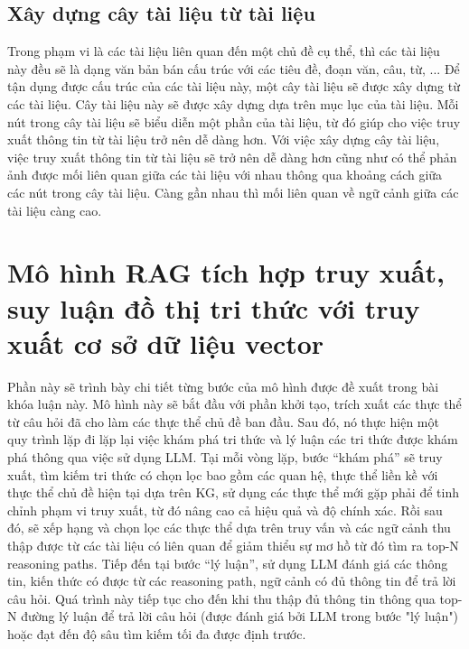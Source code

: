 \subsection{Xây dựng cây tài liệu từ tài liệu}
\label{subsection:document_tree_construction}
Trong phạm vi là các tài liệu liên quan đến một chủ đề cụ thể, thì các tài liệu này đều sẽ là dạng văn bản bán cấu trúc với các tiêu đề, đoạn văn, câu, từ, ... Để tận dụng được cấu trúc của các tài liệu này, một cây tài liệu sẽ được xây dựng từ các tài liệu. Cây tài liệu này sẽ được xây dựng dựa trên mục lục của tài liệu. Mỗi nút trong cây tài liệu sẽ biểu diễn một phần của tài liệu, từ đó giúp cho việc truy xuất thông tin từ tài liệu trở nên dễ dàng hơn. Với việc xây dựng cây tài liệu, việc truy xuất thông tin từ tài liệu sẽ trở nên dễ dàng hơn cũng như có thể phản ảnh được mối liên quan giữa các tài liệu với nhau thông qua khoảng cách giữa các nút trong cây tài liệu. Càng gần nhau thì mối liên quan về ngữ cảnh giữa các tài liệu càng cao.

\section{Mô hình RAG tích hợp truy xuất, suy luận đồ thị tri thức với truy xuất cơ sở dữ liệu vector}
\label{section:rag_integrated_knowledge_graph}
Phần này sẽ trình bày chi tiết từng bước của mô hình được đề xuất trong bài khóa luận này. Mô hình này sẽ bắt đầu với phần khởi tạo, trích xuất các thực thể từ câu hỏi đã cho làm các thực thể chủ đề ban đầu. Sau đó, nó thực hiện một quy trình lặp đi lặp lại việc khám phá tri thức và lý luận các tri thức được khám phá thông qua việc sử dụng LLM. Tại mỗi vòng lặp, bước “khám phá” sẽ truy xuất, tìm kiếm tri thức có chọn lọc bao gồm các quan hệ, thực thể liền kề với thực thể chủ đề hiện tại dựa trên KG, sử dụng các thực thể mới gặp phải để tinh chỉnh phạm vi truy xuất, từ đó nâng cao cả hiệu quả và độ chính xác. Rồi sau đó, sẽ xếp hạng và chọn lọc các thực thể dựa trên truy vấn và các ngữ cảnh thu thập được từ các tài liệu có liên quan để giảm thiểu sự mơ hồ từ đó tìm ra top-N reasoning paths. Tiếp đến tại bước “lý luận”, sử dụng LLM đánh giá các thông tin, kiến thức có được từ các reasoning path, ngữ cảnh có đủ thông tin để trả lời câu hỏi. Quá trình này tiếp tục cho đến khi thu thập đủ thông tin thông qua top-N đường lý luận để trả lời câu hỏi (được đánh giá bởi LLM trong bước "lý luận") hoặc đạt đến độ sâu tìm kiếm tối đa được định trước.

